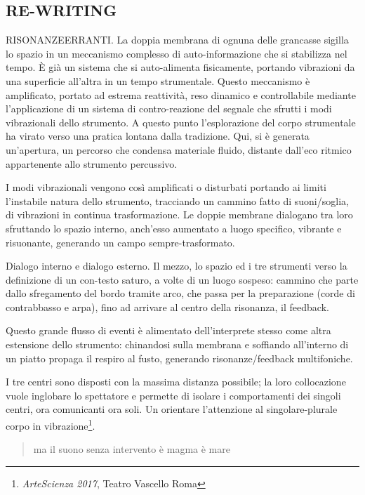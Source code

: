\documentclass[
	a0,
	portrait
	]{a0poster}
\begin{document}
\begin{multicols}{4}
\section*{\color{cyellow}RE-WRITING}

\lettrine{RISONANZE}{ERRANTI}.
La doppia membrana di ognuna delle grancasse sigilla lo spazio in un meccanismo complesso di auto-informazione che si stabilizza nel tempo. È già un sistema che si auto-alimenta fisicamente, portando vibrazioni da una superficie all'altra in un tempo strumentale. Questo meccanismo è amplificato, portato ad estrema reattività, reso dinamico e controllabile mediante l'applicazione di un sistema di contro-reazione del segnale che sfrutti i modi vibrazionali dello strumento. A questo punto l’esplorazione del corpo strumentale ha virato verso una pratica lontana dalla tradizione. Qui, si è generata un’apertura, un percorso che condensa materiale fluido, distante dall’eco ritmico appartenente allo strumento percussivo. 

I modi vibrazionali vengono così amplificati o disturbati portando ai limiti l’instabile natura dello strumento, tracciando un cammino fatto di suoni/soglia, di vibrazioni in continua trasformazione. Le doppie membrane dialogano tra loro sfruttando lo spazio interno, anch'esso aumentato a luogo specifico, vibrante e risuonante, generando un campo sempre-trasformato.

Dialogo interno e dialogo esterno. Il mezzo, lo spazio ed i tre strumenti verso la definizione di un con-testo saturo, a volte di un luogo sospeso: cammino che parte dallo sfregamento del bordo tramite arco, che passa per la preparazione (corde di contrabbasso e arpa), fino ad arrivare al centro della risonanza, il feedback.

Questo grande flusso di eventi è alimentato dell’interprete stesso come altra estensione dello strumento: chinandosi sulla membrana e soffiando all’interno di un piatto propaga il respiro al fusto, generando risonanze/feedback multifoniche. 

I tre centri sono disposti con la massima distanza possibile; la loro collocazione vuole inglobare lo spettatore  e permette di isolare i comportamenti dei singoli centri, ora comunicanti ora soli. Un orientare l’attenzione al singolare-plurale corpo in vibrazione\footnote{\color{cpurple} \emph{ArteScienza 2017}, Teatro Vascello Roma}. 

\bigskip

\begin{quotation}
\begin{it}
\begin{flushright}
\noindent ma il suono senza intervento è magma è mare
\end{flushright}
\end{it}
\end{quotation}


\end{multicols}
\end{document}
